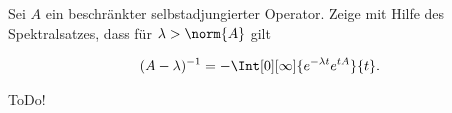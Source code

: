 \begin{exercise}[37/3]

Sei $A$ ein beschränkter selbstadjungierter Operator.
Zeige mit Hilfe des Spektralsatzes, dass für $\lambda > \norm{A}$ gilt

\begin{align*}
  (A - \lambda)^{-1}
  =
  -\Int[0][\infty]{e^{-\lambda t} e^{t A}}{t}.
\end{align*}

\end{exercise}

\begin{solution}

ToDo!

\end{solution}
